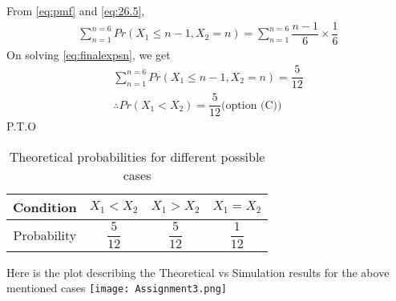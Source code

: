 \documentclass[journal,12pt,twocolumn]{IEEEtran}
\begin{document}
From \eqref{eq:pmf} and \eqref{eq:26.5},
\begin{align}
    \tag{26.7}
    \sum_{n=1}^{n=6}Pr(X_{1}\leq n-1,X_{2}=n)=\sum_{n=1}^{n=6}\dfrac{n-1}{6}\times\dfrac{1}{6}  
    \label{eq:finalexpsn}
\end{align}
On solving \eqref{eq:finalexpsn}, we get
\begin{align}
    \tag{26.8}
    \sum_{n=1}^{n=6}Pr(X_{1}\leq n-1,X_{2}=n)=\dfrac{5}{12} \\
    \tag{26.9}
    \therefore Pr(X_{1}<X_{2})=\dfrac{5}{12}\text{(option (C))}
\end{align}
P.T.O
\newpage
\begin{table}[h!]
\centering
\caption{Theoretical probabilities for different possible cases}
\label{table:1}
\begin{tabular}{|c||c|c|c|}
    \hline
    Condition & $X_{1}<X_{2}$& $X_{1}>X_{2}$& $X_{1}=X_{2}$ \\
    \hline
    Probability & $\dfrac{5}{12}$ & $\dfrac{5}{12}$ & $\dfrac{1}{12}$\\[1ex]
    \hline
\end{tabular}
\end{table}
Here is the plot describing the Theoretical vs Simulation results for the above mentioned cases
\newline
\newline
\centering
\texttt{[image: Assignment3.png]}
\end{document}

